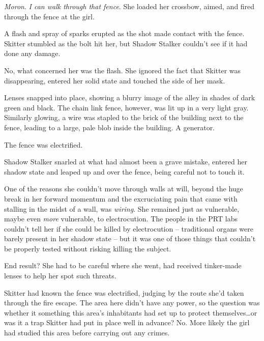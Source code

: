 \emph{Moron}.  \emph{I can walk through that fence}.  She loaded her crossbow, aimed, and fired through the fence at the girl.



A flash and spray of sparks erupted as the shot made contact with the fence.  Skitter stumbled as the bolt hit her, but Shadow Stalker couldn't see if it had done any damage.



No, what concerned her was the flash.  She ignored the fact that Skitter was disappearing, entered her solid state and touched the side of her mask.



Lenses snapped into place, showing a blurry image of the alley in shades of dark green and black.  The chain link fence, however, was lit up in a very light gray.  Similarly glowing, a wire was stapled to the brick of the building next to the fence, leading to a large, pale blob inside the building.  A generator.



The fence was electrified.



Shadow Stalker snarled at what had almost been a grave mistake, entered her shadow state and leaped up and over the fence, being careful not to touch it.



One of the reasons she couldn't move through walls at will, beyond the huge break in her forward momentum and the excruciating pain that came with stalling in the midst of a wall, was \emph{wiring}.  She remained just as vulnerable, maybe even \emph{more} vulnerable, to electrocution.  The people in the PRT labs couldn't tell her if she could be killed by electrocution – traditional organs were barely present in her shadow state – but it was one of those things that couldn't be properly tested without risking killing the subject.



End result?  She had to be careful where she went, had received tinker-made lenses to help her spot such threats.



Skitter had known the fence was electrified, judging by the route she'd taken through the fire escape.  The area here didn't have any power, so the question was whether it something this area's inhabitants had set up to protect themselves\ldots or was it a trap Skitter had put in place well in advance?  No.  More likely the girl had studied this area before carrying out any crimes.



